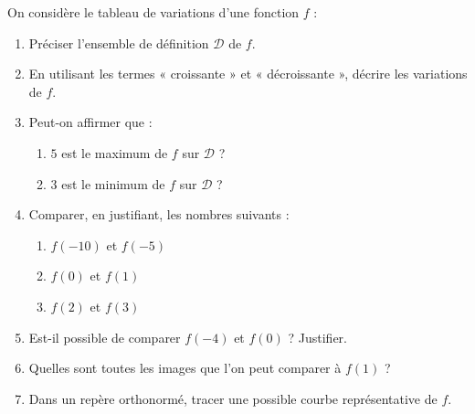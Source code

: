 \begin{exo}{}
	On considère le tableau de variations d'une fonction $f$ :

	\begin{center}
	\end{center}

	\begin{enumerate}
		\item Préciser l'ensemble de définition $\mathcal{D}$ de $f$.
		\item En utilisant les termes « croissante » et « décroissante », décrire les variations de $f$.
		\item Peut-on affirmer que :
		      \begin{enumerate}
			      \item $5$ est le maximum de $f$ sur $\mathcal{D}$ ?
			      \item $3$ est le minimum de $f$ sur $\mathcal{D}$ ?
		      \end{enumerate}
		\item Comparer, en justifiant, les nombres suivants :
		      \begin{enumerate}
			      \item $f(-10)$ et $f(-5)$
			      \item $f(0)$ et $f(1)$
			      \item $f(2)$ et $f(3)$
		      \end{enumerate}
		\item Est-il possible de comparer $f(-4)$ et $f(0)$ ? Justifier.
		\item Quelles sont toutes les images que l'on peut comparer à $f(1)$ ?
		\item Dans un repère orthonormé, tracer une possible courbe représentative de $f$.
	\end{enumerate}
\end{exo}
